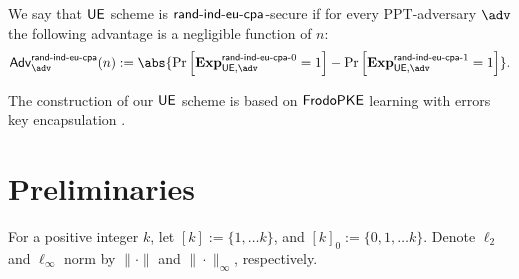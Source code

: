\documentclass{fundam}
\begin{document}
\begin{pchstack}[center]
	
	\pchspace
	
	\hspace{2cm}
	
	\pchspace
\end{pchstack}

\vspace{0.1cm}
We say that $\mathsf{UE}$ scheme is $\mathsf{rand}{\text{-}}\mathsf{ind}{\text{-}}\mathsf{eu}{\text{-}}\mathsf{cpa}$-secure if for every PPT-adversary $\adv$ the following advantage is a negligible function of $n$:
\begin{align*}
	\Adv_{\adv}^{\EUS}(n):=\abs{\Pr\left[ \Exp{\UE,\adv}{\EUmod{0}} =1 \right] - \Pr\left[ \Exp{\UE,\adv}{\EUmod{1}} =1 \right]}.
\end{align*}

\vspace{0.3cm}
\noindent
The construction of our $\mathsf{UE}$ scheme is based on $\mathsf{FrodoPKE}$ learning with errors key encapsulation \cite{Frodo}.

\section{Preliminaries}
For a positive integer $k$, let $[k]:=\{1,\ldots k\}$, and $[k]_{0}:=\{0,1,\ldots k\}$. Denote $\ell_{2}$ and $\ell_{\infty}$ norm by $\|\cdot\|$ and $\|\cdot\|_{\infty}$, respectively. 
\end{document}
